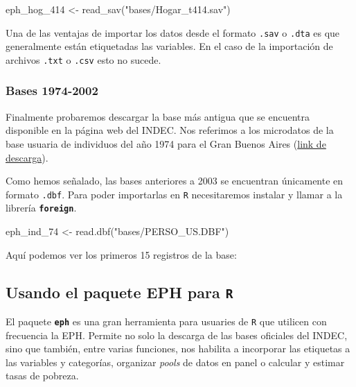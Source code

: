 \documentclass[
]{book}
\newenvironment{Shaded}{\begin{snugshade}}{\end{snugshade}}
\newcommand{\FunctionTok}[1]{\textcolor[rgb]{0.00,0.00,0.00}{#1}}
\newcommand{\NormalTok}[1]{#1}
\newcommand{\OtherTok}[1]{\textcolor[rgb]{0.56,0.35,0.01}{#1}}
\newcommand{\StringTok}[1]{\textcolor[rgb]{0.31,0.60,0.02}{#1}}
\begin{document}
\begin{Shaded}
\begin{Highlighting}[]
\NormalTok{eph\_hog\_414 }\OtherTok{\textless{}{-}} \FunctionTok{read\_sav}\NormalTok{(}\StringTok{"bases/Hogar\_t414.sav"}\NormalTok{)}
\end{Highlighting}
\end{Shaded}

Una de las ventajas de importar los datos desde el formato \texttt{.sav} o \texttt{.dta} es que generalmente están etiquetadas las variables. En el caso de la importación de archivos \texttt{.txt} o \texttt{.csv} esto no sucede.

\hypertarget{bases-1974-2002}{%
\subsubsection{Bases 1974-2002}\label{bases-1974-2002}}

Finalmente probaremos descargar la base más antigua que se encuentra disponible en la página web del INDEC. Nos referimos a los microdatos de la base usuaria de individuos del año 1974 para el Gran Buenos Aires (\href{https://www.indec.gob.ar/dbindec/eph/bases_usuarias/Bu01374.zip}{link de descarga}).

Como hemos señalado, las bases anteriores a 2003 se encuentran únicamente en formato \texttt{.dbf}. Para poder importarlas en \texttt{R} necesitaremos instalar y llamar a la librería \textbf{\texttt{foreign}}.

\begin{Shaded}
\begin{Highlighting}[]
\NormalTok{eph\_ind\_74 }\OtherTok{\textless{}{-}} \FunctionTok{read.dbf}\NormalTok{(}\StringTok{"bases/PERSO\_US.DBF"}\NormalTok{)}
\end{Highlighting}
\end{Shaded}

Aquí podemos ver los primeros 15 registros de la base:

\hypertarget{usando-el-paquete-eph-para-r}{%
\subsection{\texorpdfstring{Usando el paquete EPH para \texttt{R}}{Usando el paquete EPH para R}}\label{usando-el-paquete-eph-para-r}}

El paquete \textbf{\texttt{eph}} es una gran herramienta para usuaries de \texttt{R} que utilicen con frecuencia la EPH. Permite no solo la descarga de las bases oficiales del INDEC, sino que también, entre varias funciones, nos habilita a incorporar las etiquetas a las variables y categorías, organizar \emph{pools} de datos en panel o calcular y estimar tasas de pobreza.
\end{document}
